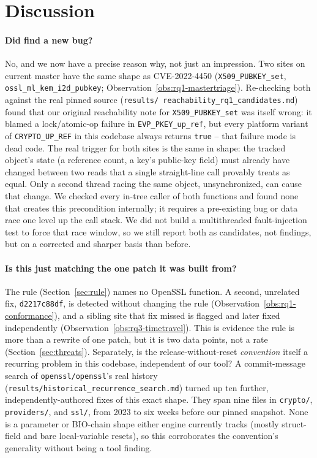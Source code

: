 \section{Discussion}
\label{sec:discussion}

\paragraph{Did \tool find a new bug?} No, and we now have a precise reason
why, not just an impression. Two sites on current master have the same
shape as CVE-2022-4450 (\texttt{X509\_PUBKEY\_set},
\texttt{ossl\_ml\_kem\_i2d\_pubkey}; Observation~\ref{obs:rq1-mastertriage}).
Re-checking both against the real pinned source (\texttt{results/\allowbreak
reachability\_rq1\_candidates.md}) found that our original reachability note
for \texttt{X509\_PUBKEY\_set} was itself wrong: it blamed a lock/atomic-op
failure in \texttt{EVP\_PKEY\_up\_ref}, but every platform variant of
\texttt{CRYPTO\_UP\_REF} in this codebase always returns \texttt{true} --
that failure mode is dead code. The real trigger for both sites is the same
in shape: the tracked object's state (a reference count, a key's public-key
field) must already have changed between two reads that a single
straight-line call provably treats as equal. Only a second thread
racing the same object, unsynchronized, can cause that change. We checked every
in-tree caller of both functions and found none that creates this
precondition internally; it requires a pre-existing bug or data race one
level up the call stack. We did not build a multithreaded fault-injection
test to force that race window, so we still report both as candidates,
not findings, but on a corrected and sharper basis than before.

\paragraph{Is this just matching the one patch it was built from?} The
rule (Section~\ref{sec:rule}) names no OpenSSL function. A second,
unrelated fix, \texttt{d2217c88df}, is detected without changing the
rule (Observation~\ref{obs:rq1-conformance}), and a sibling site that fix
missed is flagged and later fixed independently
(Observation~\ref{obs:rq3-timetravel}). This is evidence the rule is more
than a rewrite of one patch, but it is two data points, not a rate
(Section~\ref{sec:threats}). Separately, is the release-without-reset
\emph{convention} itself a recurring problem in this codebase, independent
of our tool? A commit-message search of \texttt{openssl/openssl}'s real
history (\texttt{results/historical\_recurrence\_search.md}) turned up ten
further, independently-authored fixes of this exact shape. They span
nine files in \texttt{crypto/}, \texttt{providers/}, and \texttt{ssl/},
from 2023 to six weeks before our pinned snapshot. None is a parameter or
BIO-chain shape either engine currently tracks (mostly struct-field and
bare local-variable resets), so this corroborates the convention's
generality without being a tool finding.

